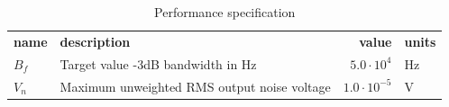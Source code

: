 \begin{table}[h]
\centering
\begin{tabular}[c]{llrl}
\textbf{name} & \textbf{description} & \textbf{value} & \textbf{units} \\ 
\rowcolor{myyellow}
$B_{f}$ &\small{Target value -3dB bandwidth in Hz} &$5.0 \cdot 10^{4}$ &$\mathrm{ Hz}$ \\ 
$V_{n}$ &\small{Maximum unweighted RMS output noise voltage} &$1.0 \cdot 10^{-5}$ &$\mathrm{ V}$ \\ 
\end{tabular}
\caption{Performance specification}
\end{table}


